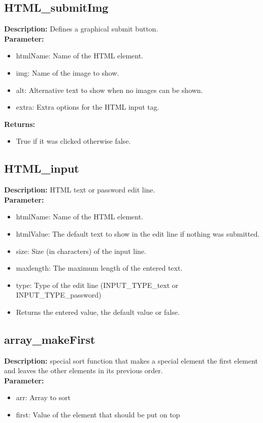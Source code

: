 \subsection{HTML\_submitImg}
\textbf{Description:} Defines a graphical submit button.\\
\textbf{Parameter:}
\begin{itemize}
\item htmlName: Name of the HTML element.
\item img: Name of the image to show.
\item alt: Alternative text to show when no images can be shown.
\item extra: Extra options for the HTML input tag.
\end{itemize}
\textbf{Returns:}
\begin{itemize}
\item True if it was clicked otherwise false.
\end{itemize}

\subsection{HTML\_input}
\textbf{Description:} HTML text or password edit line.\\
\textbf{Parameter:}
\begin{itemize}
\item htmlName: Name of the HTML element.
\item htmlValue: The default text to show in the edit line if nothing was submitted.
\item size: Size (in characters) of the input line.
\item maxlength: The maximum length of the entered text.
\item type: Type of the edit line (INPUT\_TYPE\_text or INPUT\_TYPE\_password)
\item Returns the entered value, the default value or false.
\end{itemize}

\subsection{array\_makeFirst}
\textbf{Description:} special sort function that makes a special element the first element and leaves the other elements in its previous order.\\
\textbf{Parameter:}
\begin{itemize}
\item arr: Array to sort
\item first: Value of the element that should be put on top
\end{itemize}

